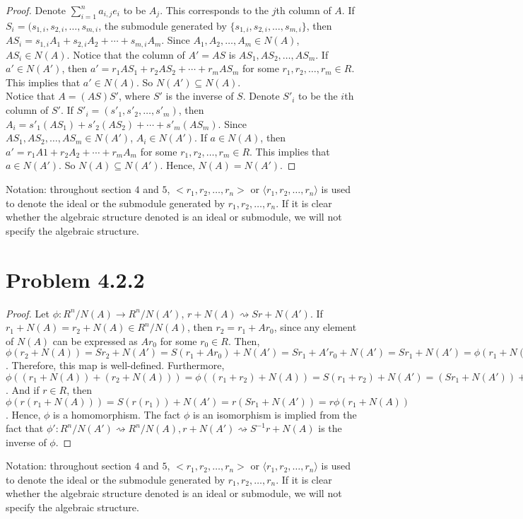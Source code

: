 \documentclass[12pt]{article}
\begin{document}
\begin{proof}
Denote $\sum_{i=1}^n a_{i,j}e_i$ to be $A_j$. This corresponds to the $j$th column of $A$. If $S_i = (s_{1,i}, s_{2, i}, \ldots, s_{m, i}$, the submodule generated by $\{ s_{1,i}, s_{2, i}, \ldots, s_{m, i} \}$, then $AS_i = s_{1,i}A_1 + s_{2,i}A_2 + \cdots + s_{m,i}A_m$. Since $A_1, A_2, \ldots, A_m \in N(A)$, $AS_i \in N(A)$. Notice that the column of $A'=AS$ is $AS_1, AS_2, \ldots, AS_m$. If $a' \in N(A')$, then $a' = r_1 AS_1 + r_2 AS_2 + \cdots + r_m AS_m$ for some $r_1, r_2, \ldots, r_m \in R$. This implies that $a' \in N(A)$. So $N(A') \subseteq N(A)$. \\

Notice that $A = (AS)S'$, where $S'$ is the inverse of $S$. Denote $S'_i$ to be the $i$th column of $S'$. If $S'_i = (s'_1, s'_2, \ldots, s'_m)$, then $A_i = s'_1(AS_1)+s'_2(AS_2)+\cdots+s'_m(AS_m)$. Since $AS_1, AS_2, \ldots, AS_m \in N(A')$, $A_i \in N(A')$. If $a \in N(A)$, then $a' = r_1 A1 + r_2 A_2 + \cdots + r_m A_m$ for some $r_1, r_2, \ldots, r_m \in R$. This implies that $a \in N(A')$. So $N(A) \subseteq N(A')$. Hence, $N(A) = N(A')$.
\end{proof}
Notation: throughout section $4$ and $5$, $<r_1, r_2, \ldots, r_n>$ or $\langle r_1, r_2, \ldots, r_n \rangle$ is used to denote the ideal or the submodule generated by $r_1, r_2, \ldots, r_n$. If it is clear whether the algebraic structure denoted is an ideal or submodule, we will not specify the algebraic structure.
\newpage 

\section{Problem 4.2.2}

\begin{proof}
Let $\phi: R^n/N(A) \longrightarrow R^n/N(A')$, $r+N(A) \rightsquigarrow Sr+N(A')$. If $r_1 + N(A) = r_2 + N(A) \in R^n/N(A)$, then $r_2 = r_1 + Ar_0$, since any element of $N(A)$ can be expressed as $Ar_0$ for some $r_0 \in R$. Then, $\phi(r_2 + N(A)) = Sr_2 + N(A') = S(r_1 + Ar_0) + N(A')= Sr_1 + A'r_0 + N(A') = Sr_1 + N(A') = \phi(r_1 + N(A))$. Therefore, this map is well-defined. Furthermore, $\phi((r_1+N(A))+(r_2+N(A))) = \phi((r_1+r_2)+N(A)) = S(r_1+r_2)+N(A') = (Sr_1+N(A')) + (Sr_2+N(A')) = \phi(r_1+N(A))+\phi(r_2+N(A))$. And if $r\in R$, then $\phi(r(r_1+N(A))) = S(r(r_1)) + N(A')= r(Sr_1 + N(A')) = r\phi(r_1 + N(A))$. Hence, $\phi$ is a homomorphism. The fact $\phi$ is an isomorphism is implied from the fact that $\phi': R^n/N(A') \rightsquigarrow R^n/N(A), r+N(A') \rightsquigarrow S^{-1}r + N(A)$ is the inverse of $\phi$.
\end{proof}
Notation: throughout section $4$ and $5$, $<r_1, r_2, \ldots, r_n>$ or $\langle r_1, r_2, \ldots, r_n \rangle$ is used to denote the ideal or the submodule generated by $r_1, r_2, \ldots, r_n$. If it is clear whether the algebraic structure denoted is an ideal or submodule, we will not specify the algebraic structure.
\newpage 
\end{document}
